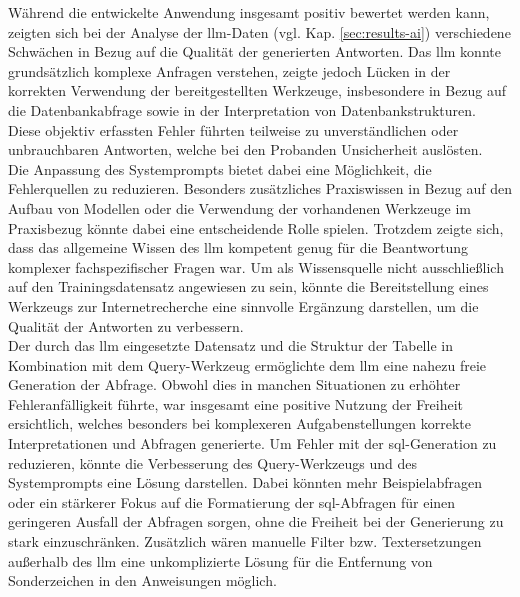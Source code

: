Während die entwickelte Anwendung insgesamt positiv bewertet werden kann, zeigten sich bei der Analyse der \gls{llm}-Daten (vgl. Kap. \ref{sec:results-ai}) verschiedene Schwächen in Bezug auf die Qualität der generierten Antworten.
Das \gls{llm} konnte grundsätzlich komplexe Anfragen verstehen, zeigte jedoch Lücken in der korrekten Verwendung der bereitgestellten Werkzeuge, insbesondere in Bezug auf die Datenbankabfrage sowie in der Interpretation von Datenbankstrukturen.
Diese objektiv erfassten Fehler führten teilweise zu unverständlichen oder unbrauchbaren Antworten, welche bei den Probanden Unsicherheit auslösten. \\

Die Anpassung des Systemprompts bietet dabei eine Möglichkeit, die Fehlerquellen zu reduzieren. Besonders zusätzliches Praxiswissen in Bezug auf den Aufbau von Modellen oder 
die Verwendung der vorhandenen Werkzeuge im Praxisbezug könnte dabei eine entscheidende Rolle spielen. Trotzdem zeigte sich, dass das allgemeine Wissen des \gls{llm} kompetent genug für die Beantwortung komplexer fachspezifischer Fragen war.
Um als Wissensquelle nicht ausschließlich auf den Trainingsdatensatz angewiesen zu sein, könnte die Bereitstellung eines Werkzeugs zur Internetrecherche eine sinnvolle Ergänzung darstellen, um die Qualität der Antworten zu verbessern. \\

Der durch das \gls{llm} eingesetzte Datensatz und die Struktur der Tabelle in Kombination mit dem Query-Werkzeug ermöglichte dem \gls{llm} eine nahezu freie Generation der Abfrage.
Obwohl dies in manchen Situationen zu erhöhter Fehleranfälligkeit führte, war insgesamt eine positive Nutzung der Freiheit ersichtlich,
welches besonders bei komplexeren Aufgabenstellungen korrekte Interpretationen und Abfragen generierte.
Um Fehler mit der \gls{sql}-Generation zu reduzieren, könnte die Verbesserung des Query-Werkzeugs und des Systemprompts eine Lösung darstellen.
Dabei könnten mehr Beispielabfragen oder ein stärkerer Fokus auf die Formatierung der \gls{sql}-Abfragen für einen geringeren Ausfall der Abfragen sorgen, ohne die Freiheit bei der Generierung zu stark einzuschränken.
Zusätzlich wären manuelle Filter bzw. Textersetzungen außerhalb des \gls{llm} eine unkomplizierte Lösung für die Entfernung von Sonderzeichen in den Anweisungen möglich. \\


